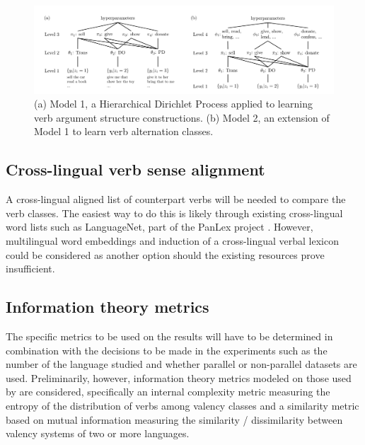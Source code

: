 \begin{figure}
    \includegraphics[width=\textwidth]{figures/verb_alternation_classes.png}
    \centering
    \caption{(a) Model 1, a Hierarchical Dirichlet Process applied to learning verb argument structure constructions. (b) Model 2,
    an extension of Model 1 to learn verb alternation classes.}\label{fig:parisien2010}
\end{figure}

\subsection{Cross-lingual verb sense alignment}\label{subsec:verblist}

A cross-lingual aligned list of counterpart verbs will be needed to compare the verb classes. The easiest way to do this is likely through existing cross-lingual word lists such as LanguageNet, part of the PanLex project \citep{kamholz2014}. However, multilingual word embeddings and induction of a cross-lingual verbal lexicon could be considered as another option should the existing resources prove insufficient.

\subsection{Information theory metrics}\label{subsec:infotheory}

The specific metrics to be used on the results will have to be determined in combination with the decisions to be made in the experiments such as the number of the language studied and whether parallel or non-parallel datasets are used. Preliminarily, however, information theory metrics modeled on those used by \citet{say2014} are considered, specifically an internal complexity metric measuring the entropy of the distribution of verbs among valency classes and a similarity metric based on mutual information measuring the similarity / dissimilarity between valency systems of two or more languages.